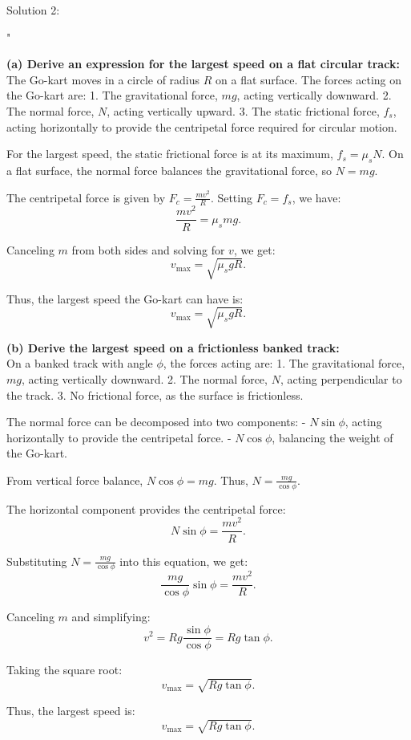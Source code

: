 Solution 2: 

"

\textbf{(a) Derive an expression for the largest speed on a flat circular track:} \\[1em]
The Go-kart moves in a circle of radius $R$ on a flat surface. The forces acting on the Go-kart are:
1. The gravitational force, $mg$, acting vertically downward.
2. The normal force, $N$, acting vertically upward.
3. The static frictional force, $f_s$, acting horizontally to provide the centripetal force required for circular motion.

For the largest speed, the static frictional force is at its maximum, $f_s = \mu_s N$. On a flat surface, the normal force balances the gravitational force, so $N = mg$.

The centripetal force is given by $F_c = \frac{mv^2}{R}$. Setting $F_c = f_s$, we have:
\[
\frac{mv^2}{R} = \mu_s mg.
\]

Canceling $m$ from both sides and solving for $v$, we get:
\[
v_{\text{max}} = \sqrt{\mu_s g R}.
\]

Thus, the largest speed the Go-kart can have is:
\[
\boxed{v_{\text{max}} = \sqrt{\mu_s g R}}.
\]

\textbf{(b) Derive the largest speed on a frictionless banked track:} \\[1em]
On a banked track with angle $\phi$, the forces acting are:
1. The gravitational force, $mg$, acting vertically downward.
2. The normal force, $N$, acting perpendicular to the track.
3. No frictional force, as the surface is frictionless.

The normal force can be decomposed into two components:
- $N\sin\phi$, acting horizontally to provide the centripetal force.
- $N\cos\phi$, balancing the weight of the Go-kart.

From vertical force balance, $N\cos\phi = mg$. Thus, $N = \frac{mg}{\cos\phi}$.

The horizontal component provides the centripetal force:
\[
N\sin\phi = \frac{mv^2}{R}.
\]

Substituting $N = \frac{mg}{\cos\phi}$ into this equation, we get:
\[
\frac{mg}{\cos\phi} \sin\phi = \frac{mv^2}{R}.
\]

Canceling $m$ and simplifying:
\[
v^2 = Rg \frac{\sin\phi}{\cos\phi} = Rg \tan\phi.
\]

Taking the square root:
\[
v_{\text{max}} = \sqrt{Rg \tan\phi}.
\]

Thus, the largest speed is:
\[
\boxed{v_{\text{max}} = \sqrt{Rg \tan\phi}}.
\]

